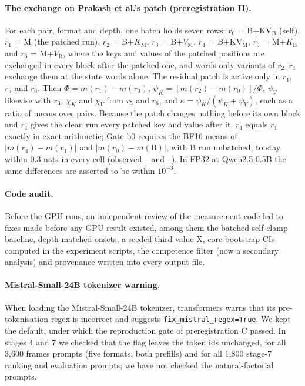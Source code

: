 \paragraph{The exchange on Prakash et al.'s patch (preregistration H).} For each pair, format and depth, one batch holds seven rows: $r_0$ = B$+$KV$_{\mathrm{B}}$ (self), $r_1$ = M (the patched run), $r_2$ = B$+K_{\mathrm{M}}$, $r_3$ = B$+V_{\mathrm{M}}$, $r_4$ = B$+$KV$_{\mathrm{M}}$, $r_5$ = M$+K_{\mathrm{B}}$ and $r_6$ = M$+V_{\mathrm{B}}$, where the keys and values of the patched positions are exchanged in every block after the patched one, and words-only variants of $r_2$--$r_4$ exchange them at the state words alone. The residual patch is active only in $r_1$, $r_5$ and $r_6$. Then $\Phi = m(r_1) - m(r_0)$, $\psi_K = [m(r_2) - m(r_0)]/\Phi$, $\psi_V$ likewise with $r_3$, $\chi_K$ and $\chi_V$ from $r_5$ and $r_6$, and $\kappa = \psi_K/(\psi_K + \psi_V)$, each as a ratio of means over pairs. Because the patch changes nothing before its own block and $r_4$ gives the clean run every patched key and value after it, $r_4$ equals $r_1$ exactly in exact arithmetic; Gate b0 requires the BF16 means of $\lvert m(r_4) - m(r_1)\rvert$ and $\lvert m(r_0) - m(\mathrm{B})\rvert$, with B run unbatched, to stay within 0.3 nats in every cell (observed \PkBzeroAMin{}--\PkBzeroAMax{} and \PkBzeroBMin{}--\PkBzeroBMax{}). In FP32 at Qwen2.5-0.5B the same differences are asserted to be within $10^{-3}$.

\paragraph{Code audit.} Before the GPU runs, an independent review of the measurement code led to fixes made before any GPU result existed, among them the batched self-clamp baseline, depth-matched onsets, a seeded third value X, core-bootstrap CIs computed in the experiment scripts, the competence filter (now a secondary analysis) and provenance written into every output file.

\paragraph{Mistral-Small-24B tokenizer warning.} When loading the Mistral-Small-24B tokenizer, transformers warns that its pre-tokenisation regex is incorrect and suggests \texttt{fix\_mistral\_regex=True}. We kept the default, under which the reproduction gate of preregistration C passed. In stages 4 and 7 we checked that the flag leaves the token ids unchanged, for all 3{,}600 frames prompts (five formats, both prefills) and for all 1{,}800 stage-7 ranking and evaluation prompts; we have not checked the natural-factorial prompts.


